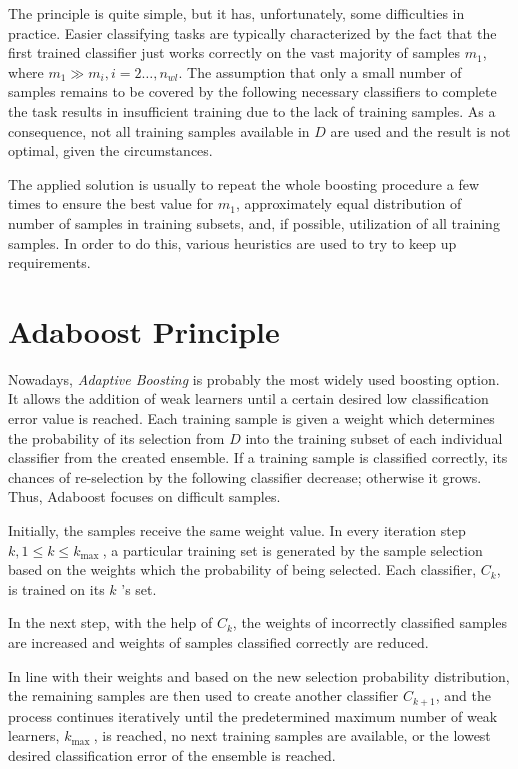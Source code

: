 The principle is quite simple, but it has, unfortunately, some difficulties in practice. Easier classifying tasks are typically characterized by the fact that the first trained classifier just works correctly on the vast majority of samples $m_{1}$, where $m_{1} \gg m_{i}, i=2 \ldots, n_{w l}$. The assumption that only a small number of samples remains to be covered by the following necessary classifiers to complete the task results in insufficient training due to the lack of training samples. As a consequence, not all training samples available in $D$ are used and the result is not optimal, given the circumstances.

The applied solution is usually to repeat the whole boosting procedure a few times to ensure the best value for $m_{1}$, approximately equal distribution of number of samples in training subsets, and, if possible, utilization of all training samples. In order to do this, various heuristics are used to try to keep up requirements.

\section{Adaboost Principle}
Nowadays, \textit{Adaptive Boosting} is probably the most widely used boosting option. It allows the addition of weak learners until a certain desired low classification error value is reached. Each training sample is given a weight which determines the probability of its selection from $D$ into the training subset of each individual classifier from the created ensemble. If a training sample is classified correctly, its chances of re-selection by the following classifier decrease; otherwise it grows. Thus, Adaboost focuses on difficult samples.

Initially, the samples receive the same weight value. In every iteration step $k, 1 \leq k \leq k_{\text {max }}$, a particular training set is generated by the sample selection based on the weights which the probability of being selected. Each classifier, $C_{k}$, is trained on its $k$ 's set.

In the next step, with the help of $C_{k}$, the weights of incorrectly classified samples are increased and weights of samples classified correctly are reduced.

In line with their weights and based on the new selection probability distribution, the remaining samples are then used to create another classifier $C_{k+1}$, and the process continues iteratively until the predetermined maximum number of weak learners, $k_{\text {max }}$, is reached, no next training samples are available, or the lowest desired classification error of the ensemble is reached.

